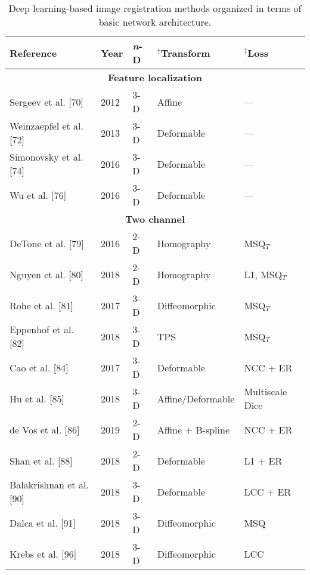 \begin{table}[!htb]
\centering
\small
\caption{Deep learning-based image registration methods organized in terms of basic
         network architecture.}
\label{table:methods}
\begin{tabular*}{0.85\textwidth}{l l l l l}
\toprule
\midrule
\textbf{Reference} & \textbf{Year} & \textbf{\textit{n}-D} & $^\dagger$\textbf{Transform} & $^\ddagger$\textbf{Loss} \\
\midrule
\midrule
\multicolumn{5}{c}{\textbf{Feature localization}}
  \vspace{0.25cm} \\
  Sergeev et al. [70] & 2012 & 3-D & Affine & --- \\
  Weinzaepfel et al. [72] & 2013 & 3-D & Deformable & --- \\
  Simonovsky et al. [74] & 2016 & 3-D & Deformable & --- \\
  Wu et al. [76] & 2016 & 3-D & Deformable & --- \\
\midrule
\multicolumn{5}{c}{\textbf{Two channel}}
  \vspace{0.25cm} \\
  DeTone et al. [79] & 2016 & 2-D & Homography & MSQ$_T$ \\ %
  Nguyen et al. [80] & 2018 & 2-D & Homography & L1, MSQ$_T$ \\ %
  Rohe et al. [81] & 2017 & 3-D & Diffeomorphic & MSQ$_T$ \\  %
  Eppenhof et al. [82] & 2018 & 3-D & TPS & MSQ$_T$ \\       %
  Cao et al. [84] & 2017 & 3-D & Deformable & NCC + ER \\
  Hu et al. [85] & 2018 & 3-D & Affine/Deformable & Multiscale Dice \\
  de Vos et al. [86] & 2019 & 2-D & Affine + B-spline & NCC + ER \\
  Shan et al. [88] & 2018 & 2-D & Deformable & L1 + ER \\
  Balakrishnan et al. [90] & 2018 & 3-D & Deformable & LCC + ER \\
  Dalca et al. [91] & 2018 & 3-D & Diffeomorphic & MSQ \\
  Krebs et al. [96] & 2018 & 3-D & Diffeomorphic & LCC \\

\end{tabular*}
\end{table}
